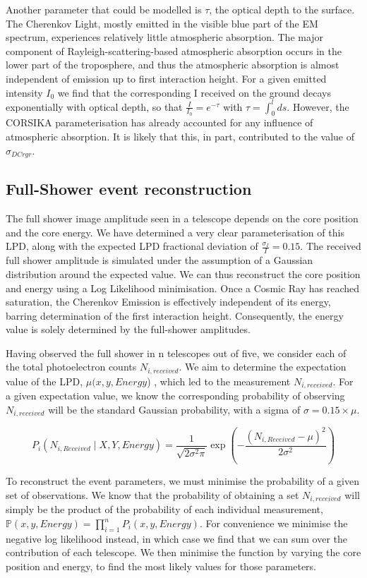 \documentclass[11pt]{article}
\begin{document}
Another parameter that could be modelled is $\tau$, the optical depth to the surface. The Cherenkov Light, mostly emitted in the visible blue part of the EM spectrum, experiences relatively little atmospheric absorption. The major component of Rayleigh-scattering-based atmospheric absorption occurs in the lower part of the troposphere, and thus the atmospheric absorption is almost independent of emission up to first interaction height. For a given emitted intensity $I_{0}$ we find that the corresponding I received on the ground decays exponentially with optical depth, so that $\frac{I}{I_{0}}=e^{-\tau}$ with $\tau=\int_{0}^{l}ds$. However, the CORSIKA parameterisation has already accounted for any influence of atmospheric absorption. It is likely that this, in part, contributed to the value of $\sigma_{DCrgr}$.

\subsection{Full-Shower event reconstruction}
The full shower image amplitude seen in a telescope depends on the core position and the core energy. We have determined a very clear parameterisation of this LPD, along with the expected LPD fractional deviation of $\frac{\sigma_{I}}{I}= 0.15$. The received full shower amplitude is simulated under the assumption of a Gaussian distribution around the expected value. We can thus reconstruct the core position and energy using a Log Likelihood minimisation. Once a Cosmic Ray has reached saturation, the Cherenkov Emission is effectively independent of its energy, barring determination of the first interaction height. Consequently, the energy value is solely determined by the full-shower amplitudes. 

Having observed the full shower in n telescopes out of five, we consider each of the total photoelectron counts $N_{i, received}$. We aim to determine the expectation value of the LPD, $\mu(x, y, Energy$) , which led to the measurement $N_{i, received}$. For a given expectation value, we know the corresponding probability of observing $N_{i, received}$ will be the standard Gaussian probability, with a sigma of $\sigma = 0.15 \times \mu$.

\[  P_{i} ( N_{i, Received} \mid X, Y, Energy )  =  \frac{1}{\sqrt{2 \sigma^{2} \pi}} \exp(-\frac{(N_{i, Received} - \mu)^{2}}{2 \sigma^{2}}) \]

To reconstruct the event parameters, we must minimise the probability of a given set of observations. We know that the probability of obtaining a set $N_{i,received}$ will simply be the product of the probability of each individual measurement, $\mathbb{P}(x, y, Energy) = \prod_{i=1}^{n} P_{i}(x, y, Energy)$. For convenience we minimise the negative log likelihood instead, in which case we find that we can sum over the contribution of each telescope. We then minimise the function by varying the core position and energy, to find the most likely values for those parameters.
\end{document}
